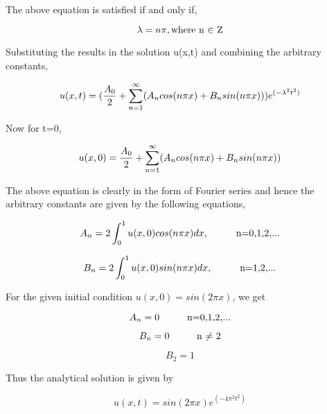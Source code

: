 \documentclass[12pt]{article}
\begin{document}
	The above equation is satisfied if and only if,
	
	\begin{equation}
	\lambda = n \pi, \\ \text{where n $\in$ Z}
	\end{equation}
	
	Substituting the results in the solution u(x,t) and combining the arbitrary constants,
	
	\begin{equation}
	u(x,t)=({A_0\over 2} +\sum_{n=1}^{\infty} (A_n cos(n \pi x)+ B_n sin(n \pi x)))e^{(-\lambda^2 t^2)} 
	\end{equation}
	
	Now for t=0,
	
	\begin{equation}
	u(x,0)={A_0\over 2} +\sum_{n=1}^{\infty} (A_n cos(n \pi x)+ B_n sin(n \pi x)) 
	\end{equation}
	
	The above equation is clearly in the form of Fourier series and hence the arbitrary constants are given by the following equations,
	
	\begin{equation}
	A_n = 2 \int_{0}^{1} u(x,0)cos (n \pi x) dx, \hspace{10mm}\text{n=0,1,2,...}
	\end{equation}
	
	\begin{equation}
	B_n = 2 \int_{0}^{1} u(x,0)sin (n \pi x) dx, \hspace{10mm}\text{n=1,2,...}
	\end{equation}
	
	For the given initial condition $u(x,0)=sin(2 \pi x)$, we get
	
	\begin{equation}
	A_n = 0 \hspace{10mm}\text{n=0,1,2,...}
	\end{equation}	
	
	\begin{equation}
	B_n = 0 \hspace{10mm}\text{n $\neq$ 2}
	\end{equation}
		
	\begin{equation}
	B_2 = 1
	\end{equation}
	
	Thus the analytical solution is given by
	
	\begin{equation}
	u(x,t)= sin(2 \pi x) e^{(-4 \pi^2 t^2)}
	\end{equation}
	
\end{document}

